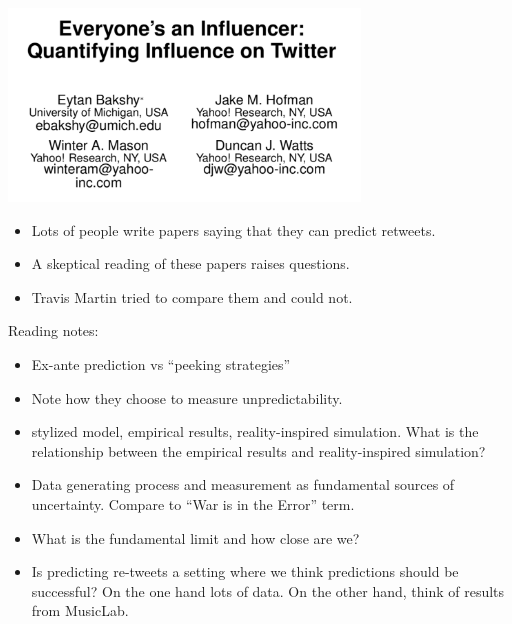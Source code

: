 \documentclass[aspectratio=169]{beamer}
\begin{document}
\begin{frame}

\begin{center}
\includegraphics[width = 0.7\textwidth]{figures/bakshy_everyones_2011_title}
\end{center}

\end{frame}
\begin{frame}

\begin{itemize}
\item Lots of people write papers saying that they can predict retweets.
\pause
\item A skeptical reading of these papers raises questions.
\pause
\item Travis Martin tried to compare them and could not.
\end{itemize} 

\end{frame}
\begin{frame}

Reading notes:
\begin{itemize}
\item Ex-ante prediction vs ``peeking strategies''
\pause
\item Note how they choose to measure unpredictability.
\pause
\item stylized model, empirical results, reality-inspired simulation. What is the relationship between the empirical results and reality-inspired simulation?
\pause
\item Data generating process and measurement as fundamental sources of uncertainty.  Compare to ``War is in the Error'' term.
\pause
\item What is the fundamental limit and how close are we?
\pause
\item Is predicting re-tweets a setting where we think predictions should be successful? On the one hand lots of data. On the other hand, think of results from MusicLab.
\end{itemize} 

\end{frame}
\end{document}
